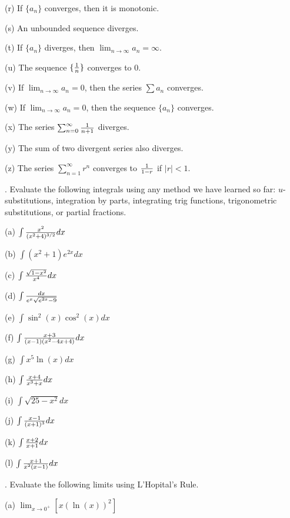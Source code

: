 \documentclass[12pt]{article}
\begin{document}
\smallskip
\noindent (r) If $\{a_n\}$ converges, then it is monotonic.

\smallskip
\noindent (s) An unbounded sequence diverges.

\smallskip
\noindent (t) If $\{a_n\}$ diverges, then $\lim_{n \to \infty} a_n = \infty$.

\smallskip
\noindent (u) The sequence $\{ {{1}\over{n}} \}$ converges to 0.

\smallskip
\noindent (v) If $\lim_{n \to \infty} a_n =0$, then the series $\sum a_n$ 
converges.

\smallskip
\noindent (w) If $\lim_{n \to \infty} a_n =0$, then the sequence $\{a_n\}$ 
converges.

\smallskip
\noindent (x) The series $\sum_{n=0}^{\infty} {{1}\over{n+1}}$ diverges.

\smallskip
\noindent (y) The sum of two divergent series also diverges.

\smallskip
\noindent (z) The series $\sum_{n=1}^{\infty} r^n$ converges to 
${{1}\over{1-r}}$ if $|r|<1$.

\bigskip
{}. Evaluate the following integrals using any method we have 
learned so far: \hfil\break
$u$-substitutions, integration by parts, integrating trig functions,
trigonometric substitutions, or partial fractions.

\noindent (a) $\int {{x^2}\over{(x^2+4)^{3/2}}} dx$

\noindent (b)  $\int (x^2+1) e^{2x} dx$

\noindent (c) $\int {{\sqrt{1-x^2}}\over{x^4}} dx$

\noindent (d)  $\int {{dx}\over{e^x \sqrt{e^{2x} - 9}}}$

\noindent (e)  $\int \sin^2(x) \cos^2(x) dx$

\noindent (f) $\int {{x+3}\over{(x-1)(x^2-4x+4)}} dx$

\noindent (g) $\int x^5 \ln (x) dx$

\noindent (h) $\int {{x+4}\over{x^3+x}} dx$

\noindent (i) $\int \sqrt{25-x^2} dx$

\noindent (j) $\int {{x-1}\over{(x+1)^3}} dx$

\noindent (k) $\int {{x+2}\over{x+1}} dx$

\noindent (l) $\int {{x+1}\over{x^2(x-1)}} dx$

\medskip
{}.  Evaluate the following limits using L'Hopital's Rule.

\noindent (a) $\lim_{x \to 0^+} [x (\ln(x))^2]$
\end{document}
